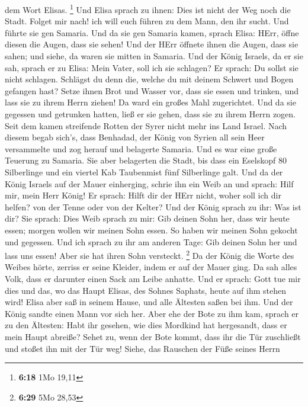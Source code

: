 dem Wort Elisas. \footnote{\textbf{6:18} 1Mo 19,11}  Und
Elisa sprach zu ihnen: Dies ist nicht der Weg noch die Stadt. Folget mir
nach! ich will euch führen zu dem Mann, den ihr sucht. Und führte sie
gen Samaria.  Und da sie gen Samaria kamen, sprach Elisa:
HErr, öffne diesen die Augen, dass sie sehen! Und der HErr öffnete ihnen
die Augen, dass sie sahen; und siehe, da waren sie mitten in Samaria.
 Und der König Israels, da er sie sah, sprach er zu Elisa:
Mein Vater, soll ich sie schlagen?  Er sprach: Du sollst
sie nicht schlagen. Schlägst du denn die, welche du mit deinem Schwert
und Bogen gefangen hast? Setze ihnen Brot und Wasser vor, dass sie essen
und trinken, und lass sie zu ihrem Herrn ziehen!  Da ward
ein großes Mahl zugerichtet. Und da sie gegessen und getrunken hatten,
ließ er sie gehen, dass sie zu ihrem Herrn zogen. Seit dem kamen
streifende Rotten der Syrer nicht mehr ins Land Israel. 
Nach diesem begab sich's, dass Benhadad, der König von Syrien all sein
Heer versammelte und zog herauf und belagerte Samaria.  Und
es war eine große Teuerung zu Samaria. Sie aber belagerten die Stadt,
bis dass ein Eselskopf 80 Silberlinge und ein viertel Kab Taubenmist
fünf Silberlinge galt.  Und da der König Israels auf der
Mauer einherging, schrie ihn ein Weib an und sprach: Hilf mir, mein Herr
König!  Er sprach: Hilft dir der HErr nicht, woher soll ich
dir helfen? von der Tenne oder von der Kelter?  Und der
König sprach zu ihr: Was ist dir? Sie sprach: Dies Weib sprach zu mir:
Gib deinen Sohn her, dass wir heute essen; morgen wollen wir meinen Sohn
essen.  So haben wir meinen Sohn gekocht und gegessen. Und
ich sprach zu ihr am anderen Tage: Gib deinen Sohn her und lass uns
essen! Aber sie hat ihren Sohn versteckt. \footnote{\textbf{6:29} 5Mo
  28,53}  Da der König die Worte des Weibes hörte, zerriss
er seine Kleider, indem er auf der Mauer ging. Da sah alles Volk, dass
er darunter einen Sack am Leibe anhatte.  Und er sprach:
Gott tue mir dies und das, wo das Haupt Elisas, des Sohnes Saphats,
heute auf ihm stehen wird!  Elisa aber saß in seinem Hause,
und alle Ältesten saßen bei ihm. Und der König sandte einen Mann vor
sich her. Aber ehe der Bote zu ihm kam, sprach er zu den Ältesten: Habt
ihr gesehen, wie dies Mordkind hat hergesandt, dass er mein Haupt
abreiße? Sehet zu, wenn der Bote kommt, dass ihr die Tür zuschließt und
stoßet ihn mit der Tür weg! Siehe, das Rauschen der Füße seines Herrn
